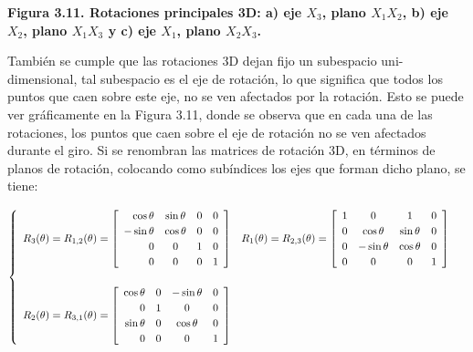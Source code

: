 \begin{center}
\textbf{Figura 3.11. \footnotesize{Rotaciones principales 3D: a) eje $X_3$, plano $X_1X_2$,   b) eje $X_2$, plano $X_1X_3$   y c) eje $X_1$, plano $X_2X_3$.}}
\end{center}

También se cumple que las rotaciones 3D dejan fijo un subespacio uni-dimensional, tal subespacio es el eje de rotación, lo que significa que todos los puntos que caen sobre este eje, no se ven afectados por la rotación. Esto se puede ver gráficamente en la Figura 3.11, donde se observa que en cada una de las rotaciones, los puntos que caen sobre el eje de rotación no se ven afectados durante el giro. Si se renombran las matrices de rotación 3D, en términos de planos de rotación, colocando como subíndices los ejes que forman dicho plano, se tiene:

\begin{equation*}
   \begin{cases}
   \begin{array}{rccl}
    $$R_3(\theta) = R_{1,2}(\theta)
    =
    \left[
    \begin{array}{rccl}
    \cos\theta & \sin\theta & 0 & 0\\
    -\sin\theta & \cos\theta & 0  &  0\\
    0 & 0 & 1 & 0 \\
    0 & 0 & 0 & 1\\
    \end{array}
    \right]
    $$
    &
    $$R_1(\theta) = R_{2,3}(\theta)
    =
    \left[
    \begin{array}{rccl}
    1 & 0 & 1 & 0\\
    0 & \cos\theta & \sin\theta &  0\\
    0 & -\sin\theta & \cos\theta & 0 \\
    0 & 0 & 0 & 1\\
    \end{array}
    \right]
    $$\\ \\
    $$R_2(\theta) = R_{3,1}(\theta)
    =
    \left[
    \begin{array}{rccl}
    \cos\theta & 0 & -\sin\theta & 0\\
    0 & 1 & 0 &  0\\
    \sin\theta & 0 & \cos\theta & 0 \\
    0 & 0 & 0 & 1\\
    \end{array}
    \right]
    $$
    \end{array}
\end{cases}
\end{equation*}


